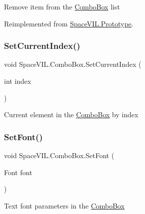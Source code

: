 Remove item from the \mbox{\hyperlink{class_space_v_i_l_1_1_combo_box}{Combo\+Box}} list 



Reimplemented from \mbox{\hyperlink{class_space_v_i_l_1_1_prototype_a7a2aabccfe6389f71d0265fa73f0ae87}{Space\+V\+I\+L.\+Prototype}}.

\mbox{\label{class_space_v_i_l_1_1_combo_box_a9e06cbc4b358a4e145284ed396da159b}} 
\subsubsection{\texorpdfstring{Set\+Current\+Index()}{SetCurrentIndex()}}
{\footnotesize\ttfamily void Space\+V\+I\+L.\+Combo\+Box.\+Set\+Current\+Index (\begin{DoxyParamCaption}\item[{int}]{index }\end{DoxyParamCaption})}



Current element in the \mbox{\hyperlink{class_space_v_i_l_1_1_combo_box}{Combo\+Box}} by index 

\mbox{\label{class_space_v_i_l_1_1_combo_box_a6054da3f7eb5440ba249ab2d15128dc9}} 
\subsubsection{\texorpdfstring{Set\+Font()}{SetFont()}}
{\footnotesize\ttfamily void Space\+V\+I\+L.\+Combo\+Box.\+Set\+Font (\begin{DoxyParamCaption}\item[{Font}]{font }\end{DoxyParamCaption})}



Text font parameters in the \mbox{\hyperlink{class_space_v_i_l_1_1_combo_box}{Combo\+Box}} 

\mbox{\label{class_space_v_i_l_1_1_combo_box_a968e19273a68fd5655ddead9149ad72c}} 
